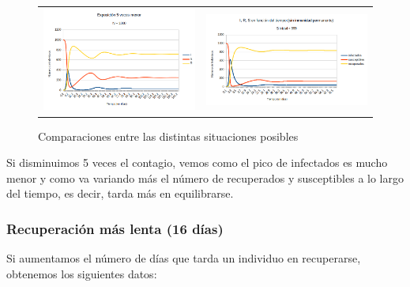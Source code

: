 \documentclass[11pt,a4paper]{report}
\begin{document}
\begin{figure}[H]
\begin{tabular}{ll}
\includegraphics[scale=0.25]{img/sin_inmunidad/exposicion_x0_5.png}
&
\includegraphics[scale=0.25]{img/sin_inmunidad/simulacion_ba_mayor.png}
\end{tabular}
\caption{Comparaciones entre las distintas situaciones posibles}
\end{figure}

Si disminuimos 5 veces el contagio, vemos como el pico de infectados es mucho menor y como va variando más el número de recuperados y susceptibles a lo largo del tiempo, es decir, tarda más en equilibrarse.

\subsubsection{Recuperación más lenta (16 días)}

Si aumentamos el número de días que tarda un individuo en recuperarse, obtenemos los siguientes datos:
\end{document}
